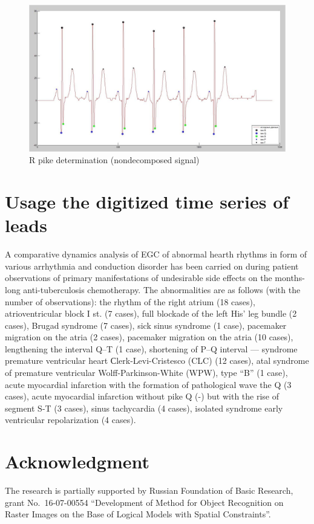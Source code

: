 \documentclass[runningheads]{AIIT}
\begin{document}
\begin{figure}[htb]
  \centering
    \includegraphics[width=0.5\linewidth] {images/NonDecomposed.jpg}
  \caption{R pike determination (nondecomposed signal)}
  \label{fig:fig7}
\end{figure}

\section{Usage the digitized time series of leads}
\label{sec:applications}

A comparative dynamics analysis of EGC of abnormal hearth rhythms in form of various arrhythmia and conduction disorder has been carried on during patient observations of primary manifestations of undesirable side effects on the months-long anti-tuberculosis chemotherapy.  The abnormalities are as follows (with the number of observations): the rhythm of the right atrium (18 cases), atrioventricular block I st. (7 cases), full blockade of the left His'  leg bundle (2 cases), Brugad syndrome (7 cases), sick sinus syndrome (1 case), pacemaker migration on the atria (2 cases), pacemaker migration on the atria (10 cases), lengthening the interval Q--T (1 case), shortening of P--Q interval --- syndrome premature ventricular heart Сlerk-Levi-Cristesco (CLC) (12 cases), atal syndrome of premature ventricular Wolff-Parkinson-White (WPW), type ``B'' (1 case), acute myocardial infarction with the formation of pathological wave the Q (3 cases), acute myocardial infarction without pike Q (-) but with the rise of segment S-T (3 cases), sinus tachycardia (4 cases), isolated syndrome early ventricular repolarization (4 cases).

\section{Acknowledgment}
\label{sec:acknowledment}

The research is partially supported by Russian Foundation of Basic Research, grant No.~16-07-00554 ``Development of Method for Object Recognition on Raster Images on the Base of Logical Models with Spatial Constraints''.
\end{document}
